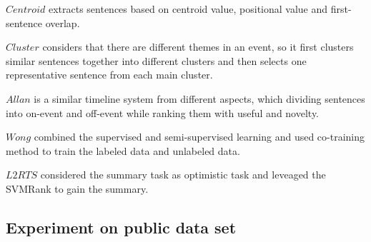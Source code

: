 \documentclass{llncs}
\begin{document}
$Centroid$ extracts sentences based on centroid value, positional value and first-sentence overlap.

$Cluster$ considers that there are different themes in an event, so it first clusters similar sentences together into different clusters and then selects one representative sentence from each main cluster.

$Allan$ is a similar timeline system from different aspects, which dividing sentences into on-event and off-event while ranking them with useful and novelty.

$Wong$ combined the supervised and semi-supervised learning and used co-training method to train the labeled data and unlabeled data. 

$L2RTS$ considered the summary task as optimistic task and  leveaged the SVMRank to gain the summary.

\subsection{Experiment on public data set}



\end{document}
